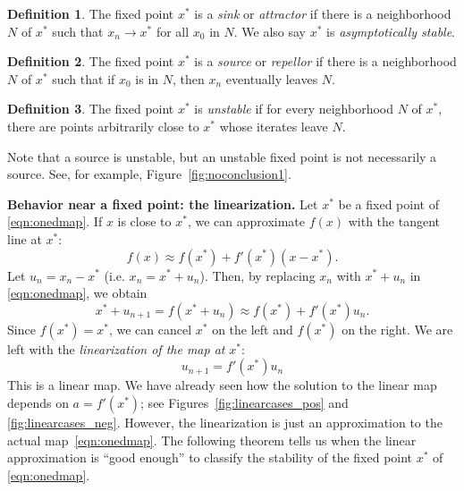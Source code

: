 \documentclass[reqno]{immbook}
\numberwithin{equation}{chapter}
\numberwithin{question}{section}
\numberwithin{theorem}{chapter}
\numberwithin{figure}{chapter}
\theoremstyle{definition}
\newtheorem{definition}{Definition}[section]
\begin{document}
\begin{definition}
The fixed point $x^*$ is a \emph{sink} or \emph{attractor}
if there is a neighborhood $N$ of $x^*$ such that
$x_n\rightarrow x^*$ for all $x_0$ in $N$.
We also say $x^*$ is \emph{asymptotically stable}.
\end{definition}
\begin{definition}
The fixed point $x^*$ is a \emph{source} or \emph{repellor}
if there is a neighborhood $N$ of $x^*$ such that if $x_0$
is in $N$, then $x_n$ eventually leaves $N$.
\end{definition}
\begin{definition}
The fixed point $x^*$ is \emph{unstable} if for every
neighborhood $N$ of $x^*$, there are points arbitrarily close
to $x^*$ whose iterates leave $N$.
\end{definition}

\vspace{0.2cm}
Note that a source is unstable, but an unstable fixed point
is not necessarily a source.  See, for example,
Figure~\ref{fig:noconclusion1}.





\noindent
\textbf{Behavior near a fixed point: the linearization.}
Let $x^*$ be a fixed point of \eqref{eqn:onedmap}.
If $x$ is close to $x^*$,
we can approximate $f(x)$ with the tangent line at $x^*$:
\begin{equation}
   f(x) \approx f(x^*) + f'(x^*)(x-x^*).
\end{equation}
Let $u_n = x_n-x^*$ (i.e. $x_n = x^* + u_n$).
Then, by replacing $x_n$ with $x^*+u_n$
in \eqref{eqn:onedmap}, we obtain
\begin{equation}
  x^* + u_{n+1} = f(x^*+u_n) \approx f(x^*)+f'(x^*)u_n.
\end{equation}
Since $f(x^*)=x^*$, we can cancel $x^*$ on the left
and $f(x^*)$ on the right.
We are left with the
\emph{linearization of the map at } $x^*$:
\begin{equation}
  u_{n+1} = f'(x^*)u_n
\end{equation}
This is a linear map.
We have already seen how the solution to the linear
map depends on $a=f'(x^*)$; see Figures~\ref{fig:linearcases_pos}
and \ref{fig:linearcases_neg}.
However, the linearization is just an approximation
to the actual map~\eqref{eqn:onedmap}.
The following theorem tells us when the linear approximation
is ``good enough'' to classify the stability of the
fixed point $x^*$ of \eqref{eqn:onedmap}.
\end{document}
